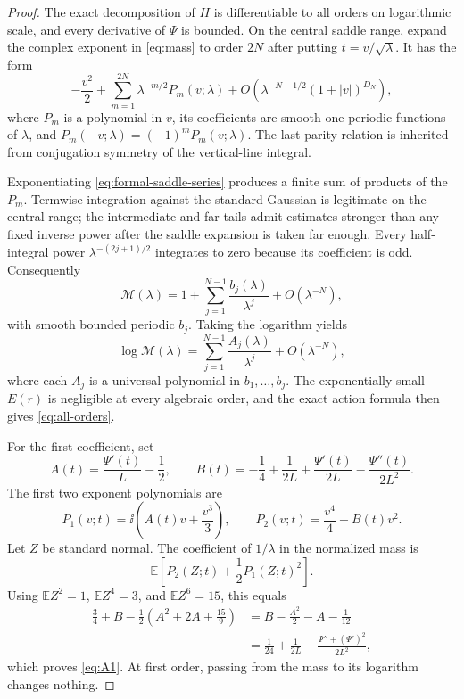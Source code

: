 \documentclass[11pt]{article}
\theoremstyle{definition}
\theoremstyle{remark}
\newcommand{\E}{\mathbb E}\newcommand{\Prob}{\mathbb P}
\begin{document}
\begin{proof}
The exact decomposition of $H$ is differentiable to all orders on logarithmic scale, and every derivative of $\Psi$ is bounded.  On the central saddle range, expand the complex exponent in \eqref{eq:mass} to order $2N$ after putting $t=v/\sqrt\lambda$.  It has the form
\begin{equation}\label{eq:formal-saddle-series}
 -\frac{v^2}{2}+
 \sum_{m=1}^{2N}\lambda^{-m/2}P_m(v;\lambda)
 +O\!\left(\lambda^{-N-1/2}(1+|v|)^{D_N}
\right),
\end{equation}
where $P_m$ is a polynomial in $v$, its coefficients are smooth one-periodic functions of $\lambda$, and $P_m(-v;\lambda)=(-1)^m\overline{P_m(v;\lambda)}$.  The last parity relation is inherited from conjugation symmetry of the vertical-line integral.

Exponentiating \eqref{eq:formal-saddle-series} produces a finite sum of products of the $P_m$.  Termwise integration against the standard Gaussian is legitimate on the central range; the intermediate and far tails admit estimates stronger than any fixed inverse power after the saddle expansion is taken far enough.  Every half-integral power $\lambda^{-(2j+1)/2}$ integrates to zero because its coefficient is odd.  Consequently
\begin{equation}\label{eq:mass-all-orders}
 \mathcal M(\lambda)=1+\sum_{j=1}^{N-1}
 \frac{b_j(\lambda)}{\lambda^j}+O(\lambda^{-N}),
\end{equation}
with smooth bounded periodic $b_j$.  Taking the logarithm yields
\[
 \log\mathcal M(\lambda)=\sum_{j=1}^{N-1}
 \frac{A_j(\lambda)}{\lambda^j}+O(\lambda^{-N}),
\]
where each $A_j$ is a universal polynomial in $b_1,\ldots,b_j$.  The exponentially small $E(r)$ is negligible at every algebraic order, and the exact action formula then gives \eqref{eq:all-orders}.

For the first coefficient, set
\begin{equation}\label{eq:AB-first}
 A(t)=\frac{\Psi'(t)}{L}-\frac12,
 \qquad
 B(t)=-\frac14+\frac1{2L}+
 \frac{\Psi'(t)}{2L}-\frac{\Psi''(t)}{2L^2}.
\end{equation}
The first two exponent polynomials are
\begin{equation}\label{eq:P1P2}
 P_1(v;t)=\ii\left(A(t)v+\frac{v^3}{3}\right),
 \qquad
 P_2(v;t)=\frac{v^4}{4}+B(t)v^2.
\end{equation}
Let $Z$ be standard normal.  The coefficient of $1/\lambda$ in the normalized mass is
\[
 \E\left[P_2(Z;t)+\frac12P_1(Z;t)^2\right].
\]
Using $\E Z^2=1$, $\E Z^4=3$, and $\E Z^6=15$, this equals
\begin{align*}
 \frac34+B-\frac12\left(A^2+2A+\frac{15}{9}\right)
 &=B-\frac{A^2}{2}-A-\frac1{12}\\
 &=\frac1{24}+\frac1{2L}
 -\frac{\Psi''+(\Psi')^2}{2L^2},
\end{align*}
which proves \eqref{eq:A1}.  At first order, passing from the mass to its logarithm changes nothing.
\end{proof}
\end{document}
